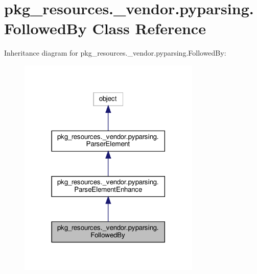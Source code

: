 \hypertarget{classpkg__resources_1_1__vendor_1_1pyparsing_1_1FollowedBy}{}\section{pkg\+\_\+resources.\+\_\+vendor.\+pyparsing.\+Followed\+By Class Reference}
\label{classpkg__resources_1_1__vendor_1_1pyparsing_1_1FollowedBy}


Inheritance diagram for pkg\+\_\+resources.\+\_\+vendor.\+pyparsing.\+Followed\+By\+:
\nopagebreak
\begin{figure}[H]
\begin{center}
\leavevmode
\includegraphics[width=246pt]{classpkg__resources_1_1__vendor_1_1pyparsing_1_1FollowedBy__inherit__graph}
\end{center}
\end{figure}


